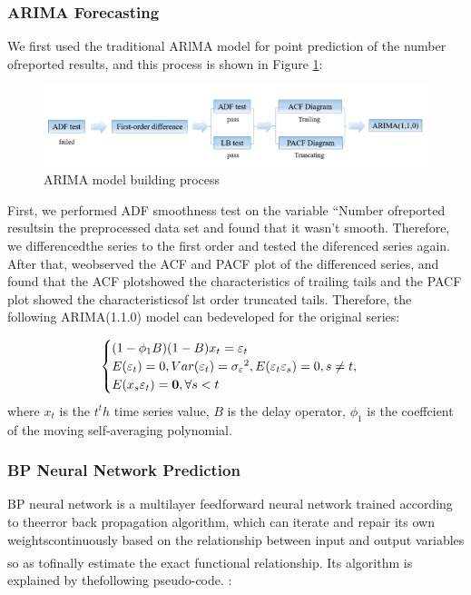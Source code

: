 \documentclass[12pt]{ctexart}
\newcommand{\upcite}[1]{\textsuperscript{\textsuperscript{\cite{#1}}}}%
\begin{document}
\subsubsection{ARIMA Forecasting}
We first used the traditional ARlMA model for point prediction of the number ofreported results, and this process is shown in Figure \ref{fg:process}:
\begin{figure}[htbp]
	\includegraphics[width=\textwidth]{1706015643684.png}
	\caption{ARIMA model building process}
	\label{fg:process}
\end{figure}

First, we performed ADF smoothness test on the variable “Number ofreported resultsin the preprocessed data set and found that it wasn't smooth. Therefore, we differencedthe series to the first order and tested the diferenced series again. After that, weobserved the ACF and PACF plot of the differenced series, and found that the ACF plotshowed the characteristics of trailing tails and the PACF plot showed the characteristicsof lst order truncated tails. Therefore, the following ARIMA(1.1.0) model can bedeveloped for the original series:

\begin{equation*}
	\centering
	\begin{cases}
		(1-\phi_1B)(1-B)x_t=\varepsilon_t\\
		E(\varepsilon_t)=0,Var(\varepsilon_t)={\sigma_{\varepsilon}}^2,E(\varepsilon_t\varepsilon_s)=0,s\neq t,\\
		E(x_s\varepsilon_t)=\mathbf{0},\forall s<t
	\end{cases}
\end{equation*}
where $x_t$ is the $t^th$ time series value, $B$ is the delay operator, $\phi_1$ is the coeffcient of the moving self-averaging polynomial.

\subsubsection{BP Neural Network Prediction}
BP neural network is a multilayer feedforward neural network trained according to theerror back propagation algorithm, which can iterate and repair its own weightscontinuously based on the relationship between input and output variables so as tofinally estimate the exact functional relationship\upcite{6}. Its algorithm is explained by thefollowing pseudo-code. :
\end{document}
